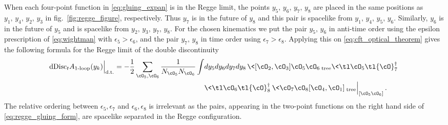 When each four-point function in \eqref{eq:gluing_expan} is in the Regge limit, the points $y_{5},\,y_{6},\,y_{7},\,y_{8}$ are placed in the same positions as $y_{1},\,y_{4},\,y_{2},\,y_{3}$ in fig.\ \ref{fig:regge_figure}, respectively. Thus $y_7$ is in the future of $y_8$ and this pair is spacelike from $y_1 ,\, y_4 ,\, y_5 ,\, y_6$. Similarly, $y_6$ is in the future of $y_5$ and is spacelike from $y_2 ,\, y_3 ,\, y_7 ,\, y_8$.
For the chosen kinematics
we put the pair $y_5 ,\, y_6$ in anti-time order  using the epsilon prescription of \eqref{eq:wightman} with $\epsilon_5 > \epsilon_6$, and the pair $y_7 ,\, y_8$ in time order using $\epsilon_7 > \epsilon_8$. Applying this on \eqref{eq:cft_optical_theorem} gives the following formula for the Regge limit of the double discontinuity
\begin{align}
	\dDisc_t A_{\text{1-loop}}(y_k) \Big|_{\text{d.t.}} = -\frac{1}{2}
	\sum\limits_{\cO_5, \cO_6}  \frac{1}{N_{\cO_5}N_{\cO_6}}\int & dy_5 dy_6 dy_7 dy_8\, \< [\cO_2 ,\cO_3 ] \cO_5 \cO_6 \>_{\text{tree}} \< \tl \cO_5 \tl{\cO}_{7}^{\dag}\>  \nonumber \\
	                                                             & \<\tl \cO_6 \tl{\cO}_{8}^{\dag}\>
	\< \cO_7 \cO_8 [\cO_4 , \cO_1]\>_{\text{tree}} \Big|_{\left[\cO_5\cO_6\right]} \,.
	\label{eq:regge_gluing_form}
\end{align}
The relative ordering between $\epsilon_5 ,\epsilon_7$ and $\epsilon_6 ,\epsilon_8$ is irrelevant as the pairs, appearing in the two-point functions on the right hand side of \eqref{eq:regge_gluing_form}, are spacelike separated in the Regge configuration.

